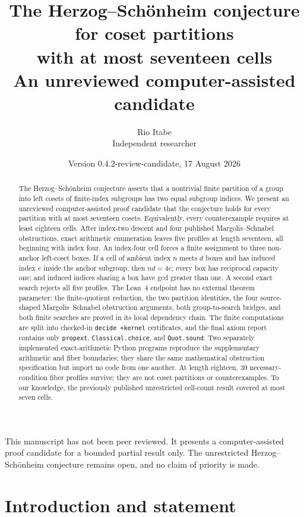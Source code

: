 \documentclass[11pt]{article}
\title{The Herzog--Sch\"onheim conjecture for coset partitions\\
with at most seventeen cells\\[3mm]
\large An unreviewed computer-assisted candidate}
\author{Rio Itabe\\\small Independent researcher}
\date{Version 0.4.2-review-candidate, 17 August 2026}
\theoremstyle{definition}
\begin{document}
\maketitle

\begin{center}
\small This manuscript has not been peer reviewed. It presents a
computer-assisted proof candidate for a bounded partial result only. The
unrestricted Herzog--Sch\"onheim conjecture remains open, and no claim of
priority is made.
\end{center}

\begin{abstract}
The Herzog--Sch\"onheim conjecture asserts that a nontrivial finite partition
of a group into left cosets of finite-index subgroups has two equal subgroup
indices. We present an unreviewed computer-assisted proof candidate that the
conjecture holds for every partition with at most seventeen cosets.
Equivalently, every counterexample
requires at least eighteen cells. After index-two descent and four published
Margolis--Schnabel obstructions, exact arithmetic enumeration leaves five
profiles at length seventeen, all beginning with index four. An index-four
cell forces a finite assignment to three non-anchor left-coset boxes. If a
cell of ambient index $n$ meets $d$ boxes and has induced index $e$ inside the
anchor subgroup, then $nd=4e$; every box has reciprocal capacity one; and
induced indices sharing a box have gcd greater than one. A second exact search
rejects all five profiles. The Lean~4 endpoint has no external theorem
parameter: the finite-quotient reduction, the two partition identities, the
four source-shaped Margolis--Schnabel obstruction arguments, both
group-to-search bridges, and both finite searches are proved in its local
dependency chain. The finite computations are split into checked-in
\texttt{decide +kernel} certificates, and the final axiom report contains only
\texttt{propext}, \texttt{Classical.choice}, and \texttt{Quot.sound}. Two
separately implemented exact-arithmetic Python programs reproduce the
supplementary arithmetic and fiber boundaries; they share the same
mathematical obstruction specification but import no code from one another.
At length eighteen,
39 necessary-condition fiber profiles survive; they are not coset partitions
or counterexamples. To our knowledge, the previously published unrestricted
cell-count result covered at most seven cells.
\end{abstract}

\section{Introduction and statement}
\end{document}
